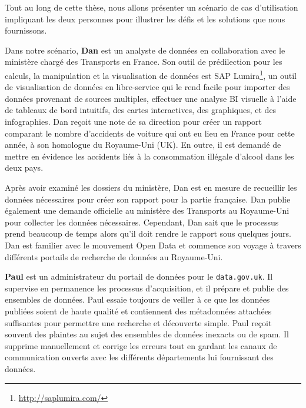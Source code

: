 Tout au long de cette th\`{e}se, nous allons pr\'{e}senter un sc\'{e}nario de cas d'utilisation impliquant les deux personnes pour illustrer les d\'{e}fis et les solutions que nous fournissons.

Dans notre sc\'{e}nario, \textbf{Dan} est un analyste de donn\'{e}es en collaboration avec le minist\`{e}re charg\'{e} des Transports en France. Son outil de pr\'{e}dilection pour les calculs, la manipulation et la visualisation de donn\'{e}es est SAP Lumira\footnote{\url{http://saplumira.com/}}, un outil de visualisation de donn\'{e}es en libre-service qui le rend facile pour importer des donn\'{e}es provenant de sources multiples, effectuer une analyse BI visuelle à l'aide de tableaux de bord intuitifs, des cartes interactives, des graphiques, et des infographies. Dan reçoit une note de sa direction pour cr\'{e}er un rapport comparant le nombre d'accidents de voiture qui ont eu lieu en France pour cette ann\'{e}e, à son homologue du Royaume-Uni (UK). En outre, il est demand\'{e} de mettre en \'{e}vidence les accidents li\'{e}s à la consommation ill\'{e}gale d'alcool dans les deux pays.

Apr\`{e}s avoir examin\'{e} les dossiers du minist\`{e}re, Dan est en mesure de recueillir les donn\'{e}es n\'{e}cessaires pour cr\'{e}er son rapport pour la partie française. Dan publie \'{e}galement une demande officielle au minist\`{e}re des Transports au Royaume-Uni pour collecter les donn\'{e}es n\'{e}cessaires. Cependant, Dan sait que le processus prend beaucoup de temps alors qu'il doit rendre le rapport sous quelques jours. Dan est familier avec le mouvement Open Data et commence son voyage à travers diff\'{e}rents portails de recherche de donn\'{e}es au Royaume-Uni.

\textbf{Paul} est un administrateur du portail de donn\'{e}es pour le \texttt{data.gov.uk}. Il supervise en permanence les processus d'acquisition, et il pr\'{e}pare et publie des ensembles de donn\'{e}es. Paul essaie toujours de veiller à ce que les donn\'{e}es publi\'{e}es soient de haute qualit\'{e} et contiennent des m\'{e}tadonn\'{e}es attach\'{e}es suffisantes pour permettre une recherche et d\'{e}couverte simple. Paul reçoit souvent des plaintes au sujet des ensembles de donn\'{e}es inexacts ou de spam. Il supprime manuellement et corrige les erreurs tout en gardant les canaux de communication ouverts avec les diff\'{e}rents d\'{e}partements lui fournissant des donn\'{e}es.


